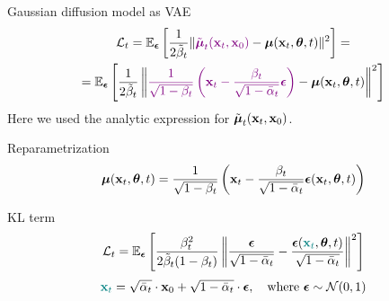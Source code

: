 \begin{frame}{Gaussian diffusion model as VAE}
	\begin{multline*}
		\mathcal{L}_t = \mathbb{E}_{\boldsymbol{\epsilon}} \left[ \frac{1}{2\tilde{\beta}_t} \| {\color{violet} \tilde{\boldsymbol{\mu}}_t(\mathbf{x}_t, \mathbf{x}_0)} - \boldsymbol{\mu}(\mathbf{x}_t, \boldsymbol{\theta}, t) \|^2 \right] = \\ 
		= \mathbb{E}_{\boldsymbol{\epsilon}} \left[ \frac{1}{2\tilde{\beta}_t} \left\| {\color{violet} \frac{1}{\sqrt{1 - \beta_t}}\left( \mathbf{x}_t - \frac{\beta_t}{\sqrt{1 - \bar{\alpha}_t} } \boldsymbol{\epsilon} \right)} - \boldsymbol{\mu}(\mathbf{x}_t, \boldsymbol{\theta}, t) \right\|^2 \right]
	\end{multline*}
    {\color{gray}Here we used the analytic expression for $\tilde{\boldsymbol{\mu}}_t(\mathbf{x}_t, \mathbf{x}_0)$.}
	\begin{block}{Reparametrization}
		\vspace{-0.3cm}
		\[
			\boldsymbol{\mu}(\mathbf{x}_t, \boldsymbol{\theta}, t) = \frac{1}{\sqrt{1 - \beta_t}}\left( \mathbf{x}_t - \frac{\beta_t}{\sqrt{1 - \bar{\alpha}_t} } \boldsymbol{\epsilon}(\mathbf{x}_t, \boldsymbol{\theta}, t) \right) 
		\]
		\vspace{-0.6cm}
	\end{block}
	\begin{block}{KL term}
		\vspace{-0.2cm}
		\[
			\mathcal{L}_t = \mathbb{E}_{\boldsymbol{\epsilon}} \left[ \frac{\beta_t^2}{2\tilde{\beta}_t (1 - \beta_t)} \left\| \frac{\boldsymbol{\epsilon}}{\sqrt{1 - \bar{\alpha}_t}} - \frac{\boldsymbol{\epsilon}({\color{teal}\mathbf{x}_t}, \boldsymbol{\theta}, t)}{\sqrt{1 - \bar{\alpha}_t}}\right\|^2 \right]
		\]
		\[
			{\color{teal}\mathbf{x}_t} = \sqrt{\bar{\alpha}_t} \cdot \mathbf{x}_{0} + \sqrt{1 - \bar{\alpha}_t} \cdot \boldsymbol{\epsilon}, \quad \text{where } \boldsymbol{\epsilon} \sim \mathcal{N}(0, 1)
		\]
		\vspace{-0.5cm}
	\end{block}
\end{frame}
